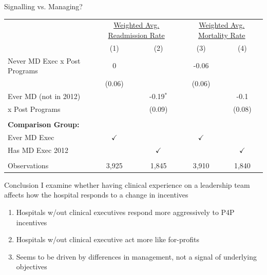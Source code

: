 \documentclass[notes,11pt, aspectratio=169]{beamer}
\begin{document}
\begin{frame}{Signalling vs. Managing?}

\footnotesize
\begin{table}[ht!]
\centering
\begin{tabular}[t]{lcccc}
\toprule
\multicolumn{1}{c}{ } & \multicolumn{2}{c}{\underline{Weighted Avg. Readmission Rate}} & \multicolumn{2}{c}{\underline{Weighted Avg. Mortality Rate}} \\
\addlinespace
 & (1) & (2) & (3) & (4)\\
\midrule
Never MD Exec x Post Programs & 0 &  & -0.06 & \\
 & (0.06) &  & (0.06) & \\
Ever MD (not in 2012) &  & -0.19$^{*}$ &  & -0.1\\
 \hspace{3mm} x Post Programs &  & (0.09) &  & (0.08)\\
 &  &  &  & \\
\addlinespace
\textbf{Comparison Group:} &  &  &  & \\
Ever MD Exec & $\checkmark$ &  & $\checkmark$ & \\
Has MD Exec 2012 &  & $\checkmark$ &  & $\checkmark$\\
 &  &  &  & \\
Observations & 3,925 & 1,845 & 3,910 & 1,840\\
\bottomrule
\end{tabular}
\end{table}


\end{frame}

\begin{frame}{Conclusion}
I examine whether having clinical experience on a leadership team affects how the hospital responds to a change in incentives

\vspace{5mm}

\begin{enumerate}
    \item Hospitals w/out clinical executives respond more aggressively to P4P incentives \pause

    \vspace{3mm}
    
    \item Hospitals w/out clinical executive act more like for-profits \pause

    \vspace{3mm}

    
    \item Seems to be driven by differences in management, not a signal of underlying objectives
\end{enumerate}
\end{frame}
\end{document}
